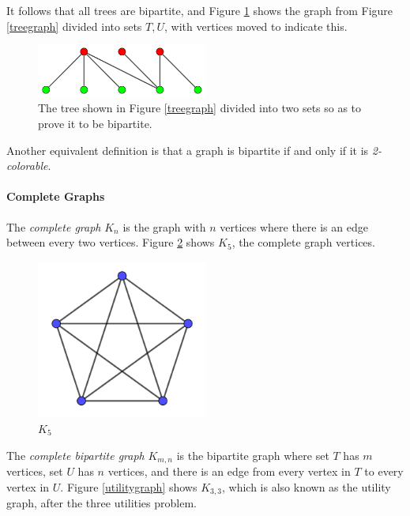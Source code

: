 	It follows that all trees are bipartite, and Figure \ref{bipartitetree} shows the graph from Figure \ref{treegraph} divided into sets \(T,U\), with vertices moved to indicate this.
	
	\begin{figure}[h]
		\centering
		\includegraphics[width=0.5\textwidth]{bipartitetree}
		\caption{The tree shown in Figure \ref{treegraph} divided into two sets so as to prove it to be bipartite.}
		\label{bipartitetree}
	\end{figure}
	
	Another equivalent definition is that a graph is bipartite if and only if it is \textit{2-colorable}\footnotemark[\ref{definedlater}].
	
	\paragraph{Complete Graphs}
	
	The \textit{complete graph} \(K_n\) is the graph with \(n\) vertices where there is an edge between every two vertices. Figure \ref{k5graph} shows \(K_5\), the complete graph vertices.
	
	\begin{figure}[h]
		\centering
		\includegraphics[width=0.5\textwidth]{k5graph}
		\caption{\(K_5\)}
		\label{k5graph}
	\end{figure}
	
	The \textit{complete bipartite graph} \(K_{m,n}\) is the bipartite graph where set \(T\) has \(m\) vertices, set \(U\) has \(n\) vertices, and there is an edge from every vertex in \(T\) to every vertex in \(U\). Figure \ref{utilitygraph} shows \(K_{3,3}\), which is also known as the utility graph, after the three utilities problem.
	
